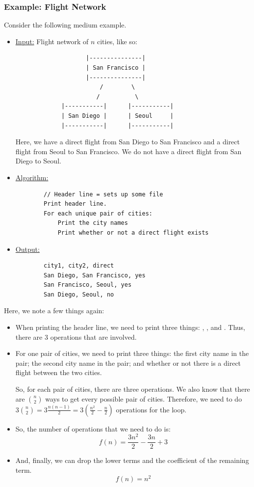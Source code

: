\documentclass[letterpaper]{article}
\begin{document}
\subsubsection{Example: Flight Network}
Consider the following medium example. 
\begin{itemize}
    \item \underline{Input:} Flight network of $n$ cities, like so: 
    \begin{verbatim}
                    |---------------|
                    | San Francisco |
                    |---------------|
                        /        \
                       /          \
             |-----------|      |-----------|
             | San Diego |      | Seoul     |
             |-----------|      |-----------|
    \end{verbatim}
    Here, we have a direct flight from San Diego to San Francisco and a direct flight from Seoul to San Francisco. We do not have a direct flight from San Diego to Seoul. 

    \item \underline{Algorithm:}
    \begin{verbatim}
        // Header line = sets up some file 
        Print header line. 
        For each unique pair of cities: 
            Print the city names 
            Print whether or not a direct flight exists 
    \end{verbatim}

    \item \underline{Output:}
    \begin{verbatim}
        city1, city2, direct 
        San Diego, San Francisco, yes 
        San Francisco, Seoul, yes 
        San Diego, Seoul, no
    \end{verbatim}
\end{itemize}
Here, we note a few things again: 
\begin{itemize}
    \item When printing the header line, we need to print three things: , , and . Thus, there are 3 operations that are involved. 

    \item For one pair of cities, we need to print three things: the first city name in the pair; the second city name in the pair; and whether or not there is a direct flight between the two cities. 

    \bigskip 

    So, for each pair of cities, there are three operations. We also know that there are $\binom{n}{2}$ ways to get every possible pair of cities. Therefore, we need to do $3\binom{n}{2} = 3\frac{n(n - 1)}{2} = 3\left(\frac{n^2}{2} - \frac{n}{2}\right)$ operations for the loop. 

    \item So, the number of operations that we need to do is: 
    \[f(n) = \frac{3n^2}{2} - \frac{3n}{2} + 3\]

    \item And, finally, we can drop the lower terms and the coefficient of the remaining term. 
    \[f(n) = n^2\]
\end{itemize}
\end{document}
